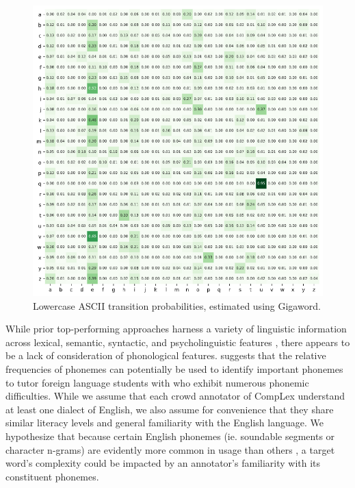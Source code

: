 \documentclass{dcthesis}
\theoremstyle{definition}
\theoremstyle{remark}
\begin{document}
\begin{figure}
  \centering
  \includegraphics[scale=0.55]{character_transition_probabilities.png}
  \captionsetup{justification=centering}
  \caption{\label{fig:character_transition_probabilities} Lowercase ASCII transition probabilities, estimated using Gigaword.}
\end{figure}

While prior top-performing approaches harness a variety of linguistic information across lexical, semantic, syntactic, and psycholinguistic features \citep{paetzold2016sv000gg, ronzano2016taln, mukherjee2016ju_nlp}, there appears to be a lack of consideration of phonological features. \citet{hayden1950relative} suggests that the relative frequencies of phonemes can potentially be used to identify important phonemes to tutor foreign language students with who exhibit numerous phonemic difficulties. While we assume that each crowd annotator of CompLex understand at least one dialect of English, we also assume for convenience that they share similar literacy levels and general familiarity with the English language. We hypothesize that because certain English phonemes (ie. soundable segments or character n-grams) are evidently more common in usage than others \citep{hayden1950relative}, a target word's complexity could be impacted by an annotator's familiarity with its constituent phonemes.
\end{document}
